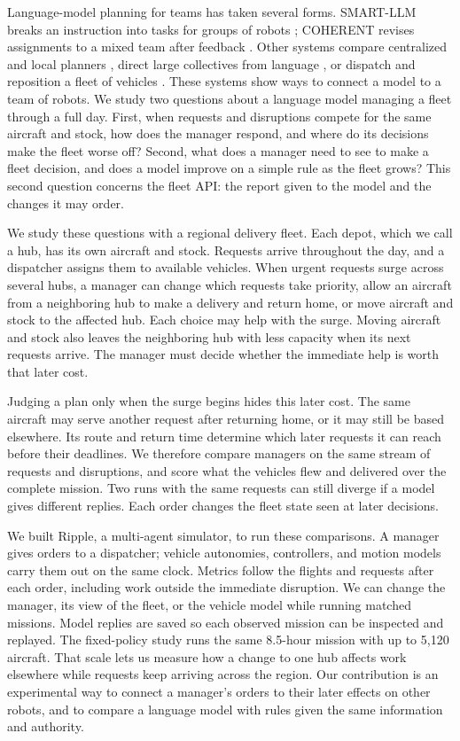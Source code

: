 \documentclass[letterpaper,10pt,conference]{ieeeconf}
\begin{document}
Language-model planning for teams has taken several forms. SMART-LLM
breaks an instruction into tasks for groups of robots
\cite{kannan2024smartllm}; COHERENT revises assignments to a mixed team
after feedback \cite{liu2025coherent}. Other systems compare centralized
and local planners \cite{chen2024scalable}, direct large collectives from
language \cite{vatnsdal2026compass}, or dispatch and reposition a fleet
of vehicles \cite{lyu2025llmoddr}. These systems show ways to connect a
model to a team of robots. We study two questions about a language model
managing a fleet through a full day. First, when requests and disruptions
compete for the same aircraft and stock, how does the manager respond, and
where do its decisions make the fleet worse off? Second, what does a
manager need to see to make a fleet decision, and does a model improve
on a simple rule as the fleet grows? This second question concerns the
fleet API: the report given to the model and the changes it may order.

We study these questions with a regional delivery fleet. Each depot, which we
call a hub, has its own aircraft and stock. Requests arrive throughout the
day, and a dispatcher assigns them to available vehicles. When urgent
requests surge across several hubs, a manager can change which requests
take priority, allow an aircraft from a neighboring hub to make a delivery
and return home, or move aircraft and stock to the affected hub. Each
choice may help with the surge. Moving aircraft and stock also leaves the
neighboring hub with less capacity when its next requests arrive. The
manager must decide whether the immediate help is worth that later cost.

Judging a plan only when the surge begins hides this later cost. The
same aircraft may serve another request after returning home, or it may
still be based elsewhere. Its route and return time determine which later
requests it can reach before their deadlines. We therefore compare
managers on the same stream of requests and disruptions, and score what
the vehicles flew and delivered over the complete mission. Two runs with
the same requests can still diverge if a model gives different replies.
Each order changes the fleet state seen at later decisions.

We built Ripple, a multi-agent simulator, to run these comparisons.
A manager gives orders to a dispatcher; vehicle autonomies, controllers,
and motion models carry them out on the same clock. Metrics follow the
flights and requests after each order, including work outside the immediate
disruption. We can change the manager, its view of the fleet, or the vehicle
model while running matched missions. Model replies are saved so each
observed mission can be inspected and replayed. The fixed-policy study runs
the same 8.5-hour mission with up to 5,120 aircraft. That scale lets us
measure how a change to one hub affects work elsewhere while requests keep
arriving across the region.
Our contribution is an experimental way to connect a manager's orders to
their later effects on other robots, and to compare a language model with
rules given the same information and authority.
\end{document}
